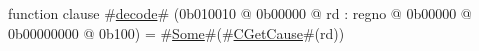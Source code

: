 function clause #\hyperref[zdecode]{decode}# (0b010010 @ 0b00000 @ rd : regno @    0b00000 @ 0b00000000 @ 0b100) = #\hyperref[zSome]{Some}#(#\hyperref[zCGetCause]{CGetCause}#(rd))
